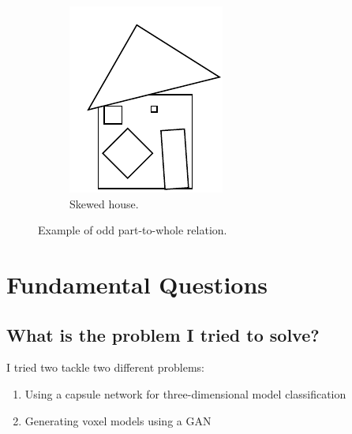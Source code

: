 \documentclass[11pt]{article}
\begin{document}
\begin{figure}
\begin{adjustbox}{minipage=\linewidth,scale=0.8}
\begin{subfigure}[b]{0.4\textwidth}
		\includegraphics[width=\textwidth]{askew}
		\caption{Skewed house.}
		\label{fig:askew}
	\end{subfigure}
	\caption{Example of odd part-to-whole relation.}
	\label{fig:example}
	\end{adjustbox}
\end{figure}


\section{Fundamental Questions}

\subsection{What is the problem I tried to solve?}
I tried two tackle two different problems:
\begin{enumerate}
	\item Using a capsule network for three-dimensional model classification
	\item Generating voxel models using a GAN
\end{enumerate}
\end{document}
